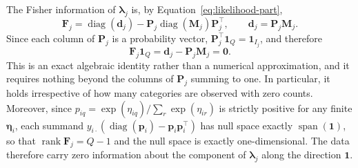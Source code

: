 The Fisher information of $\bm{\lambda}_j$ is, by Equation~\eqref{eq:likelihood-part},
\begin{equation}
    \mathbf{F}_{j}=\operatorname{diag}(\mathbf{d}_{j})-\mathbf{P}_{j}\operatorname{diag}(\mathbf{M}_{j})\mathbf{P}_{j}^{\top},
    \qquad \mathbf{d}_{j}=\mathbf{P}_{j}\mathbf{M}_{j} .
\end{equation}
Since each column of $\mathbf{P}_j$ is a probability vector,
$\mathbf{P}_j^\top\mathbf{1}_Q=\mathbf{1}_{I_j}$, and therefore
\begin{equation}
    \mathbf{F}_{j}\mathbf{1}_{Q}=\mathbf{d}_{j}-\mathbf{P}_{j}\mathbf{M}_{j}=\mathbf{0} .
    \label{eq:F-singular}
\end{equation}
This is an exact algebraic identity rather than a numerical approximation, and it requires nothing beyond the columns of $\mathbf{P}_j$ summing to one. In particular, it holds irrespective of how many categories are observed with zero counts. Moreover, since $p_{iq}=\exp(\eta_{iq})/\sum_{r}\exp(\eta_{ir})$ is strictly positive for any finite $\bm{\eta}_i$, each summand $y_{i\cdot}(\operatorname{diag}(\bm{p}_i)-\bm{p}_i\bm{p}_i^\top)$ has null space exactly $\operatorname{span}(\mathbf{1})$, so that $\operatorname{rank}\mathbf{F}_j=Q-1$ and the null space is exactly one-dimensional. The data therefore carry zero information about the component of $\bm{\lambda}_j$ along the direction $\mathbf{1}$.


